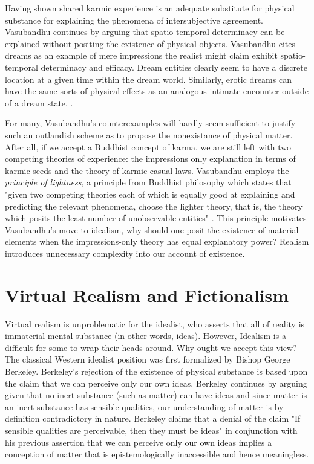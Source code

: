 Having shown shared karmic experience is an adequate substitute for physical substance for explaining the phenomena of intersubjective agreement.  Vasubandhu continues by arguing that spatio-temporal determinacy can be explained without positing the existence of physical objects. Vasubandhu cites dreams as an example of mere impressions the realist might claim exhibit spatio-temporal determinacy and efficacy. Dream entities clearly seem to have a discrete location at a given time within the dream world. Similarly, erotic dreams can have the same sorts of physical effects as an analogous intimate encounter outside of a dream state. \cite{siderits2007buddhism}.
\newline

For many, Vasubandhu's counterexamples will hardly seem sufficient to justify such an outlandish scheme as to propose the nonexistance of physical matter. After all, if we accept a Buddhist concept of karma, we are still left with two competing theories of experience: the impressions only explanation in terms of karmic seeds and the theory of karmic casual laws. \cite{siderits2007buddhism} Vasubandhu employs the \textit{principle of lightness}, a principle from Buddhist philosophy which states that "given two competing theories each of which is equally good at explaining and predicting the relevant phenomena, choose the lighter theory, that is, the theory which posits the least number of unobservable entities" \cite{siderits2007buddhism}. This principle motivates Vasubandhu's move to idealism, why should one posit the existence of material elements when the impressions-only theory has equal explanatory power? Realism introduces unnecessary complexity into our account of existence.  

\section{Virtual Realism and Fictionalism}
Virtual realism is unproblematic for the idealist, who asserts that all of reality is immaterial mental substance (in other words, ideas). However, Idealism is a difficult for some to wrap their heads around. Why ought we accept this view? The classical Western idealist position was first formalized by Bishop George Berkeley. Berkeley's rejection of the existence of physical substance is based upon the claim that we can perceive only our own ideas. Berkeley continues by arguing given that no inert substance (such as matter) can have ideas and since matter is an inert substance has sensible qualities, our understanding of matter is by definition contradictory in nature. Berkeley claims that a denial of the claim "If sensible qualities are perceivable, then they must be ideas" in conjunction with his previous assertion that we can perceive only our own ideas implies a conception of matter that is epistemologically inaccessible and hence meaningless. \cite{berkeley2003a}
\\

